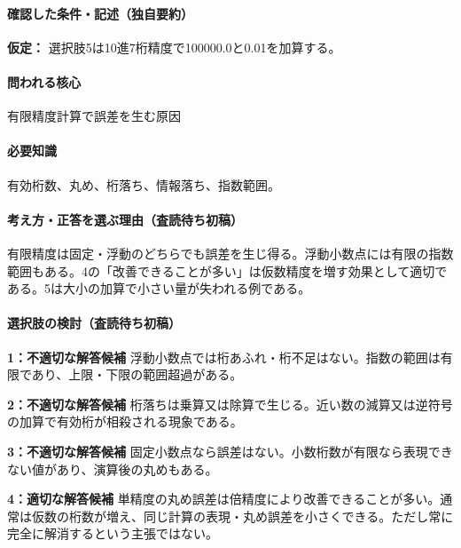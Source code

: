 \paragraph{確認した条件・記述（独自要約）}\mbox{}\par

\noindent\textbf{仮定：} 選択肢5は10進7桁精度で100000.0と0.01を加算する。\par

\paragraph{問われる核心} 有限精度計算で誤差を生む原因

\paragraph{必要知識} 有効桁数、丸め、桁落ち、情報落ち、指数範囲。

\paragraph{考え方・正答を選ぶ理由（査読待ち初稿）} 有限精度は固定・浮動のどちらでも誤差を生じ得る。浮動小数点には有限の指数範囲もある。4の「改善できることが多い」は仮数精度を増す効果として適切である。5は大小の加算で小さい量が失われる例である。

\paragraph{選択肢の検討（査読待ち初稿）}\mbox{}\par

\noindent\textbf{1：不適切な解答候補} 浮動小数点では桁あふれ・桁不足はない。指数の範囲は有限であり、上限・下限の範囲超過がある。\par

\noindent\textbf{2：不適切な解答候補} 桁落ちは乗算又は除算で生じる。近い数の減算又は逆符号の加算で有効桁が相殺される現象である。\par

\noindent\textbf{3：不適切な解答候補} 固定小数点なら誤差はない。小数桁数が有限なら表現できない値があり、演算後の丸めもある。\par

\noindent\textbf{4：適切な解答候補} 単精度の丸め誤差は倍精度により改善できることが多い。通常は仮数の桁数が増え、同じ計算の表現・丸め誤差を小さくできる。ただし常に完全に解消するという主張ではない。\par


